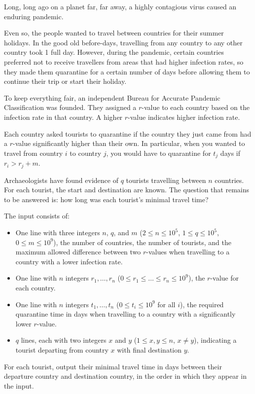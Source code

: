 

\newcommand{\maxn}{10^5}
\newcommand{\maxq}{10^5}
\newcommand{\maxt}{10^9}
\newcommand{\maxm}{10^9}
\newcommand{\maxr}{10^9}

Long, long ago on a planet far, far away, a highly contagious virus caused an enduring pandemic.

Even so, the people wanted to travel between countries for their summer holidays.
In the good old before-days, travelling from any country to any other country took 1 full day.
However, during the pandemic,
certain countries preferred not to receive travellers from areas that had higher infection rates,
so they made them quarantine for a certain number of days before allowing them to continue their trip or start their holiday.

To keep everything fair, an independent Bureau for Accurate Pandemic Classification was founded. They assigned a $r$-value to each country based on the infection rate in that country. A higher $r$-value indicates higher infection rate.

Each country asked tourists to quarantine if the country they just came from had a $r$-value significantly higher than their own. In particular, when you wanted to travel from country $i$ to country $j$, you would have to quarantine for $t_j$ days if $r_i > r_j + m$.

Archaeologists have found evidence of $q$ tourists travelling between $n$
countries. For each tourist, the start and destination are known. The question
that remains to be answered is: how long was each tourist's minimal travel time?


\begin{Input}
	The input consists of:
	\begin{itemize}
		\item One line with three integers $n$, $q$, and $m$
			($2\leq n \leq \maxn$, $1\leq q \leq \maxq$, $0\leq m \leq \maxm$),
			the number of countries,
			the number of tourists, and
			the maximum allowed difference between two $r$-values
			when travelling to a country with a lower infection rate.
		\item One line with $n$ integers $r_1, \dots, r_n$
			($0 \leq r_1 \leq \dots \leq r_n \leq \maxr$), the $r$-value for each country.
		\item One line with $n$ integers $t_1, \dots, t_n$ ($0 \leq t_i \leq \maxt$ for all $i$),
			the required quarantine time in days when travelling to a country with a significantly lower $r$-value.
		\item $q$ lines, each with two integers $x$ and $y$ ($1 \leq x, y \leq n$, $x \neq y$),
			indicating a tourist departing from country $x$ with final destination $y$.
	\end{itemize}
\end{Input}

\begin{Output}
	For each tourist, output their minimal travel time in days between their
	departure country and destination country, in the order in which they appear in the input.
\end{Output}

